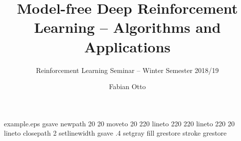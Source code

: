 %
%
%
%
%
\begin{filecontents*}{example.eps}
    gsave
    newpath
    20 20 moveto
    20 220 lineto
    220 220 lineto
    220 20 lineto
    closepath
    2 setlinewidth
    gsave
    .4 setgray fill
    grestore
    stroke
    grestore
\end{filecontents*}
%
\RequirePackage{fix-cm}
%
\documentclass{svjour3}                     %
%
\smartqed  %
%
\usepackage{graphicx}
\usepackage{amssymb}
\usepackage{amsmath}
\usepackage[final]{pdfpages}

%
%
%
%
%

\newcommand{\argmax}[1]{\underset{#1}{\operatorname{arg}\,\operatorname{max}}\;}



    \title{Model-free Deep Reinforcement Learning -- Algorithms and Applications}
    \subtitle{Reinforcement Learning Seminar -- Winter Semester 2018/19}

    \author{Fabian Otto}


